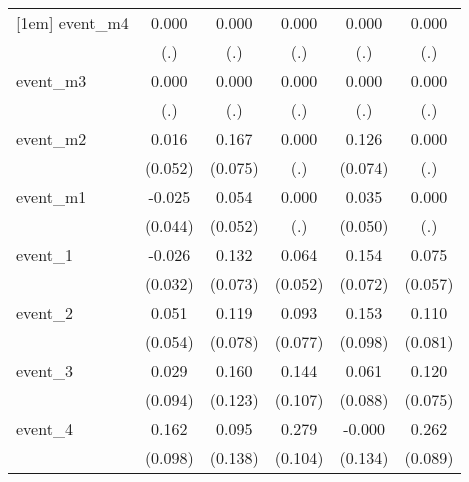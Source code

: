 {\begin{tabular}{l*{5}{c}}
[1em]
event\_m4    &       0.000         &       0.000         &       0.000         &       0.000         &       0.000         \\
            &         (.)         &         (.)         &         (.)         &         (.)         &         (.)         \\
[1em]
event\_m3    &       0.000         &       0.000         &       0.000         &       0.000         &       0.000         \\
            &         (.)         &         (.)         &         (.)         &         (.)         &         (.)         \\
[1em]
event\_m2    &       0.016         &       0.167\sym{*}  &       0.000         &       0.126         &       0.000         \\
            &     (0.052)         &     (0.075)         &         (.)         &     (0.074)         &         (.)         \\
[1em]
event\_m1    &      -0.025         &       0.054         &       0.000         &       0.035         &       0.000         \\
            &     (0.044)         &     (0.052)         &         (.)         &     (0.050)         &         (.)         \\
[1em]
event\_1     &      -0.026         &       0.132         &       0.064         &       0.154\sym{*}  &       0.075         \\
            &     (0.032)         &     (0.073)         &     (0.052)         &     (0.072)         &     (0.057)         \\
[1em]
event\_2     &       0.051         &       0.119         &       0.093         &       0.153         &       0.110         \\
            &     (0.054)         &     (0.078)         &     (0.077)         &     (0.098)         &     (0.081)         \\
[1em]
event\_3     &       0.029         &       0.160         &       0.144         &       0.061         &       0.120         \\
            &     (0.094)         &     (0.123)         &     (0.107)         &     (0.088)         &     (0.075)         \\
[1em]
event\_4     &       0.162         &       0.095         &       0.279\sym{**} &      -0.000         &       0.262\sym{**} \\
            &     (0.098)         &     (0.138)         &     (0.104)         &     (0.134)         &     (0.089)         \\

\end{tabular}}
